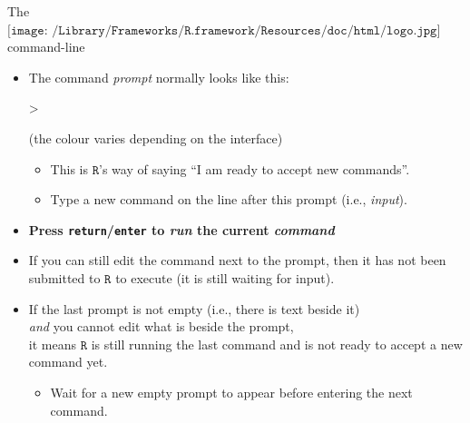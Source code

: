 \documentclass[
  ignorenonframetext,
]{beamer}
\newenvironment{Shaded}{\begin{snugshade}}{\end{snugshade}}
\newcommand{\AlertTok}[1]{\textcolor[rgb]{0.94,0.16,0.16}{#1}}
\newcommand{\NormalTok}[1]{#1}
\providecommand{\tightlist}{%
  \setlength{\itemsep}{0pt}\setlength{\parskip}{0pt}}
\begin{document}
\begin{frame}[fragile]{The
\(\texttt{[image: /Library/Frameworks/R.framework/Resources/doc/html/logo.jpg]}\)
command-line}
\protect\hypertarget{the-includegraphicsheight1emlibraryframeworksr.frameworkresourcesdochtmllogo.jpg-command-line}{}
\begin{itemize}
\item
  The command \emph{prompt} normally looks like this:

\begin{Shaded}
\begin{Highlighting}[]
\NormalTok{\textgreater{}}
\end{Highlighting}
\end{Shaded}

  {\footnotesize (the colour varies depending on the interface)}

  \begin{itemize}
  \tightlist
  \item
    This is \(\texttt{R}\)'s way of saying ``I am ready to accept new
    commands''.
  \item
    Type a new command on the line after this prompt (i.e.,
    \emph{input}).
  \end{itemize}
\item
  \textbf{Press \AlertTok{\texttt{return}}/\AlertTok{\texttt{enter}} to
  \emph{run} the current \emph{command} }
\item
  If you can still edit the command next to the prompt, then it has not
  been submitted to \(\texttt{R}\) to execute (it is still waiting for
  input).
\item
  If the last prompt is not empty (i.e., there is text beside it)\\
  \emph{and} you cannot edit what is beside the prompt,\\
  it means \(\texttt{R}\) is still running the last command and is not
  ready to accept a new command yet.

  \begin{itemize}
  \tightlist
  \item
    Wait for a new empty prompt to appear before entering the next
    command.
  \end{itemize}
\end{itemize}
\end{frame}
\end{document}
